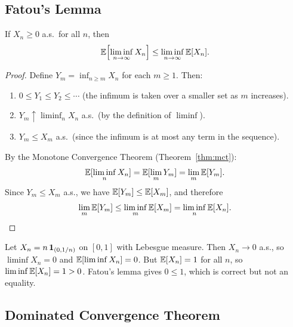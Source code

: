 \documentclass[11pt,a4paper]{article}
\begin{document}
\subsection{Fatou's Lemma}
\label{subsec:fatou}

\begin{keyresult}[title={Fatou's Lemma}]
\begin{theorem}
\label{thm:fatou}
If $X_n \geq 0$ a.s.\ for all $n$, then
\begin{equation}
  \mathbb{E}\!\left[\liminf_{n \to \infty} X_n\right]
  \leq \liminf_{n \to \infty} \mathbb{E}[X_n].
  \label{eq:fatou}
\end{equation}
\end{theorem}
\end{keyresult}

\begin{proof}
Define $Y_m = \inf_{n \geq m} X_n$ for each $m \geq 1$.  Then:
\begin{enumerate}[nosep]
  \item $0 \leq Y_1 \leq Y_2 \leq \cdots$ (the infimum is taken
    over a smaller set as $m$ increases).
  \item $Y_m \uparrow \liminf_{n} X_n$ a.s.\ (by the definition
    of $\liminf$).
  \item $Y_m \leq X_m$ a.s.\ (since the infimum is at most any
    term in the sequence).
\end{enumerate}
By the Monotone Convergence Theorem (Theorem~\ref{thm:mct}):
\begin{equation}
  \mathbb{E}[\liminf_n X_n]
  = \mathbb{E}[\lim_m Y_m]
  = \lim_m \mathbb{E}[Y_m].
\end{equation}
Since $Y_m \leq X_m$ a.s., we have
$\mathbb{E}[Y_m] \leq \mathbb{E}[X_m]$, and therefore
\begin{equation}
  \lim_m \mathbb{E}[Y_m]
  \leq \liminf_m \mathbb{E}[X_m]
  = \liminf_n \mathbb{E}[X_n].
  \qedhere
\end{equation}
\end{proof}

\begin{remark}
\label{rem:fatou_strict}
Let $X_n = n\, \mathbf{1}_{(0, 1/n)}$ on $[0,1]$ with Lebesgue
measure.  Then $X_n \to 0$ a.s., so
$\liminf X_n = 0$ and $\mathbb{E}[\liminf X_n] = 0$.  But
$\mathbb{E}[X_n] = 1$ for all $n$, so $\liminf \mathbb{E}[X_n] = 1 > 0$.
Fatou's lemma gives $0 \leq 1$, which is correct but not an
equality.
\end{remark}

\subsection{Dominated Convergence Theorem}
\label{subsec:dct}
\end{document}
